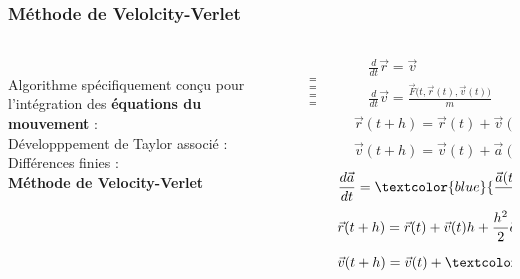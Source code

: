 \documentclass{beamer}
\begin{document}
\begin{frame}
\frametitle{Méthode de Velolcity-Verlet}
\small
\begin{columns}[t]
\begin{column}{0.38\textwidth}
\\
\vspace{-0.05cm}
Algorithme spécifiquement conçu pour l'intégration des \textbf{équations du mouvement} :\\
\vspace{1.0cm}
Développpement de Taylor associé :\\
\vspace{1.55cm}
Différences finies :\\
\vspace{1.25cm}
\textbf{Méthode de Velocity-Verlet}

\end{column}
%
\begin{column}{0.06\textwidth}
\vspace{0.4cm}
\\
$\Rightarrow$\\
\vspace{1.6cm}
$\Rightarrow$\\
\vspace{1.7cm}
$\Rightarrow$\\
\vspace{1.3cm}
$\Rightarrow$
\end{column}
%
\begin{column}{0.53\textwidth}
\vspace{-0.6cm}
\begin{align*}
& \frac{d}{dt}\vec{r} = \vec{v} \\
& \frac{d}{dt}\vec{v} = \frac{\vec{F}\big(t,\vec{r}(t),\vec{v}(t)\big)}{m}
\end{align*}
\vspace{-0.5cm}
\begin{align*}
& \vec{r}(t+h) = \vec{r}(t) + \vec{v}(t)h + \frac{h^2}{2}\vec{a}(t)\\
& \vec{v}(t+h) = \vec{v}(t) + \vec{a}(t)h + \frac{h^2}{2}\frac{d\vec{a}}{dt}
\end{align*}
\vspace{0.cm}
\hrulefill
\begin{equation*}
\frac{d\vec{a}}{dt} = \textcolor{blue}{\frac{\vec{a}(t+h) - \vec{a}}{h}}
\end{equation*}
\vspace{-0.4cm}
\begin{align*}
& \vec{r}(t+h) = \vec{r}(t) + \vec{v}(t)h + \frac{h^2}{2}\vec{a}(t)\\
& \vec{v}(t+h) = \vec{v}(t) + \textcolor{blue}{\frac{\vec{a}(t) + \vec{a}(t+h)}{2}h}
\end{align*}
\end{column}
\end{columns}

\end{frame}
\end{document}
